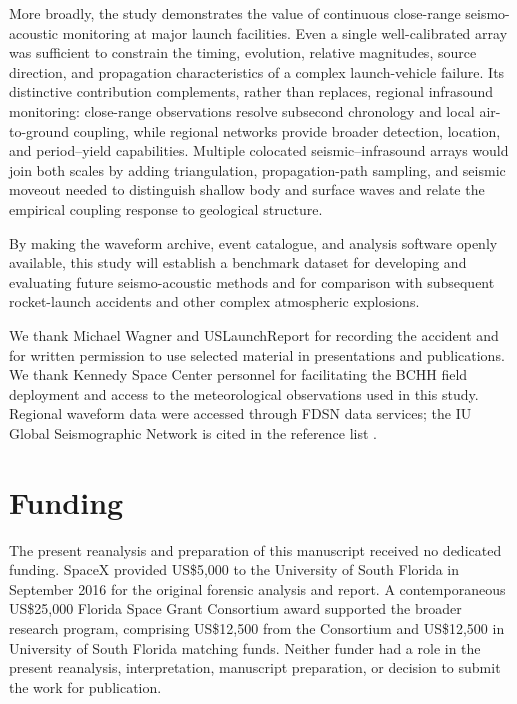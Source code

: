 \documentclass[]{seismica}
\begin{document}
More broadly, the study demonstrates the value of continuous close-range
seismo-acoustic monitoring at major launch facilities. Even a single
well-calibrated array was sufficient to constrain the timing, evolution,
relative magnitudes, source direction, and propagation characteristics of a
complex launch-vehicle failure. Its distinctive contribution complements,
rather than replaces, regional infrasound monitoring: close-range observations
resolve subsecond chronology and local air-to-ground coupling, while regional
networks provide broader detection, location, and period--yield capabilities.
Multiple colocated seismic--infrasound arrays
would join both scales by adding triangulation, propagation-path sampling, and
seismic moveout needed to distinguish shallow body and surface waves and relate
the empirical coupling response to geological structure.

By making the waveform archive, event catalogue, and analysis software openly available, this study will establish a benchmark dataset for developing and evaluating future seismo-acoustic methods and for comparison with subsequent rocket-launch accidents and other complex atmospheric explosions.

\begin{acknowledgements}
We thank Michael Wagner and USLaunchReport for recording the accident and for written permission to use selected material in presentations and publications. We thank Kennedy Space Center personnel for facilitating the BCHH field deployment and access to the meteorological observations used in this study. Regional waveform data were accessed through FDSN data services; the IU Global Seismographic Network is cited in the reference list \citep{asl_gsn_iu_1988}.
\end{acknowledgements}

\section*{Funding}

The present reanalysis and preparation of this manuscript received no
dedicated funding. SpaceX provided US\$5,000 to the University of South Florida
in September 2016 for the original forensic analysis and report. A
contemporaneous US\$25,000 Florida Space Grant Consortium award supported the
broader research program, comprising US\$12,500 from the Consortium and
US\$12,500 in University of South Florida matching funds. Neither funder had a
role in the present reanalysis, interpretation, manuscript preparation, or
decision to submit the work for publication.
\end{document}
